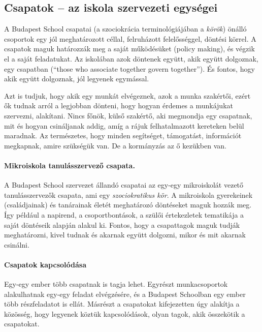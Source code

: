 \subsection{Csapatok -- az iskola szervezeti
egységei}

A Budapest School csapatai (a szociokrácia terminológiájában a
\emph{körök}) önálló csoportok egy jól meghatározott céllal, felruházott
felelősséggel, döntési körrel. A csapatok maguk határozzák meg a saját
működésüket (policy making), és végzik el a saját feladatukat. Az
iskolában azok döntenek együtt, akik együtt dolgoznak, egy csapatban
(``those who associate together govern together''). És fontos, hogy akik
együtt dolgoznak, jól legyenek egy\-mással.

Azt is tudjuk, hogy akik egy munkát elvégeznek, azok a munka szak\-ér\-tői,
ezért ők tudnak arról a legjobban dönteni, hogy hogyan érdemes a
munká\-ju\-kat szervezni, alakítani. Nincs főnök, külső szakértő, aki
megmondja egy csapatnak, mit és hogyan csináljanak addig, amíg a rájuk
felhatalmazott kereteken belül maradnak. Az természetes, hogy minden
segítséget, támogatást, információt megkapnak, amire szükségük van. De a
kormányzás az ő kezükben van.


\paragraph{Mikroiskola tanulásszervező
csapata.}

A Budapest School szervezet állandó csapatai az egy-egy mikroiskolát
vezető tanulásszervezők csapata, ami egy \emph{szociokratikus kör}. A
mikroiskola gyerekeinek (családjainak) és tanárainak életét meghatározó
döntéseket maguk hozzák meg. Így például a napirend, a csoportbontások,
a szülői értekezletek tematikája a saját döntéseik alapján alakul ki.
Fontos, hogy a csapattagok maguk tudják meghatározni, kivel tudnak és
akarnak együtt dolgozni, mikor és mit akarnak csinálni.


\paragraph{Csapatok kapcsolódása}

Egy-egy ember több csapatnak is tagja lehet. Egyrészt munkacsoportok
alakulhatnak egy-egy feladat elvégzésére, és a Budapest Schoolban egy
ember több részfeladatot is ellát. Másrészt a csapatokat kifejezetten
úgy alakítja a közösség, hogy legyenek köztük kapcsolódások, olyan tagok,
akik összekötik a csapatokat.

